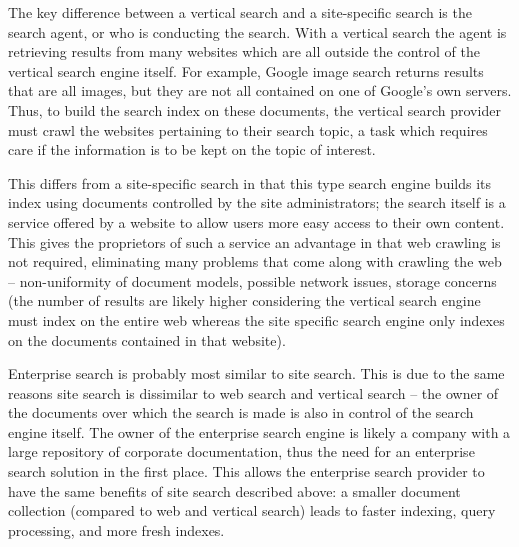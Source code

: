 The key difference between a vertical search and a site-specific search is the search agent, or who is conducting the search.  With a vertical search the agent is retrieving results from many websites which are all outside the control of the vertical search engine itself.  For example, Google image search returns results that are all images, but they are not all contained on one of Google's own servers.  Thus, to build the search index on these documents, the vertical search provider must crawl the websites pertaining to their search topic, a task which requires care if the information is to be kept on the topic of interest.

This differs from a site-specific search in that this type search engine builds its index using documents controlled by the site administrators; the search itself is a service offered by a website to allow users more easy access to their own content.  This gives the proprietors of such a service an advantage in that web crawling is not required, eliminating many problems that come along with crawling the web -- non-uniformity of document models, possible network issues, storage concerns (the number of results are likely higher considering the vertical search engine must index on the entire web whereas the site specific search engine only indexes on the documents contained in that website).

Enterprise search is probably most similar to site search.  This is due to the same reasons site search is dissimilar to web search and vertical search -- the owner of the documents over which the search is made is also in control of the search engine itself.  The owner of the enterprise search engine is likely a company with a large repository of corporate documentation, thus the need for an enterprise search solution in the first place.  This allows the enterprise search provider to have the same benefits of site search described above: a smaller document collection (compared to web and vertical search) leads to faster indexing, query processing, and more fresh indexes.
